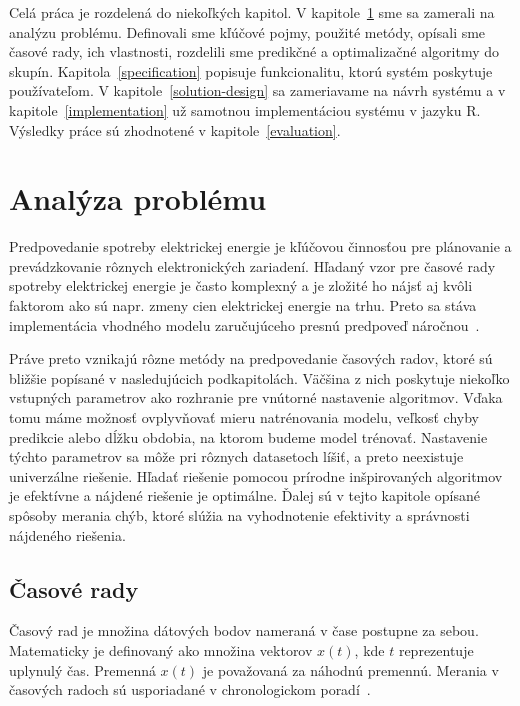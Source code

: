 \documentclass[a4paper,slovak,12pt,appendix]{article}
\begin{document}
Celá práca je rozdelená do niekoľkých kapitol. V
kapitole~\ref{problem-analysis} sme sa zamerali na analýzu problému. Definovali
sme kľúčové pojmy, použité metódy, opísali sme časové rady, ich vlastnosti,
rozdelili sme predikčné a optimalizačné algoritmy do skupín.
Kapitola~\ref{specification} popisuje funkcionalitu, ktorú systém poskytuje
používateľom. V kapitole~\ref{solution-design} sa zameriavame na návrh systému
a v kapitole~\ref{implementation} už samotnou implementáciou systému v jazyku R.
Výsledky práce sú zhodnotené v kapitole~\ref{evaluation}.


\newpage
\section{Analýza problému}
\label{problem-analysis}
Predpovedanie spotreby elektrickej energie je kľúčovou činnosťou pre plánovanie
a prevádzkovanie rôznych elektronických zariadení. Hľadaný vzor pre časové
rady spotreby elektrickej energie je často komplexný a je zložité ho nájsť aj
kvôli faktorom ako sú napr. zmeny cien elektrickej energie na trhu. Preto sa
stáva implementácia vhodného modelu zaručujúceho presnú predpoveď
náročnou~\cite{Mahalakshmi2016}.

Práve preto vznikajú rôzne metódy na predpovedanie časových radov, ktoré sú
bližšie popísané v nasledujúcich podkapitolách. Väčšina z nich poskytuje
niekoľko vstupných parametrov ako rozhranie pre vnútorné nastavenie algoritmov.
Vďaka tomu máme možnosť ovplyvňovať mieru natrénovania modelu, veľkosť chyby
predikcie alebo dĺžku obdobia, na ktorom budeme model trénovať. Nastavenie
týchto parametrov sa môže pri rôznych datasetoch líšiť, a preto neexistuje
univerzálne riešenie. Hľadať riešenie pomocou prírodne inšpirovaných
algoritmov je efektívne a nájdené riešenie je optimálne. Ďalej sú v tejto
kapitole opísané spôsoby merania chýb, ktoré slúžia na vyhodnotenie efektivity
a správnosti nájdeného riešenia.


\subsection{Časové rady}
Časový rad je množina dátových bodov nameraná v čase postupne za sebou.
Matematicky je definovaný ako množina vektorov $x(t)$, kde $t$ reprezentuje
uplynulý čas. Premenná $x(t)$ je považovaná za náhodnú premennú.
Merania v časových radoch sú usporiadané v chronologickom
poradí~\cite{Agrawal2013}.
\end{document}
